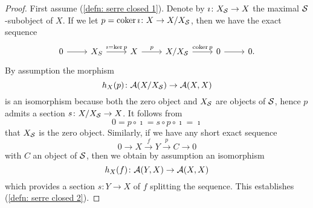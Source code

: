 \begin{proof}
  First assume (\ref{defn: serre closed 1}).
  Denote by \(\imath \colon X_{\mathcal{S}} \to X\) the maximal \(\mathcal{S}\)-subobject of \(X\).
  If we let \(p = \operatorname{coker}\imath \colon X \to X/X_{\mathcal{S}}\), then we have the exact sequence
  \[\begin{tikzcd}
  0 \arrow{r} & X_S \arrow{r}{\imath = \op{ker} p} & X \arrow{r}{p} & X/X_\Serre \arrow{r}{\op{coker}{p}} & 0 \arrow{r} & 0.
  \end{tikzcd}\]
  By assumption the morphism
  \[h_X(p) \colon \mathcal{A}(X/X_{\mathcal{S}}) \to \mathcal{A}(X,X)\]
  is an isomorphism because both the zero object and \(X_{\mathcal{S}}\) are objects of \(\mathcal{S}\), hence  \(p\) admits a section \(s \colon X/X_{\mathcal{S}} \to X\).
  It follows from
  \[0 = p \circ  \imath = s \circ p \circ \imath = \imath\]
  that \(X_{\mathcal{S}}\) is the zero object.
  Similarly, if we have any short exact sequence
  \[0 \to X \overset{f}\to Y \overset{p}\to C \to 0\]
  with \(C\) an object of \(\mathcal{S}\), then we obtain by assumption an isomorphism
  \[h_X(f) \colon \mathcal{A}(Y,X) \to \mathcal{A}(X,X)\]
  which provides a section \(s \colon Y \to X\) of \(f\) splitting the sequence.
  This establishes (\ref{defn: serre closed 2}).


\end{proof}
